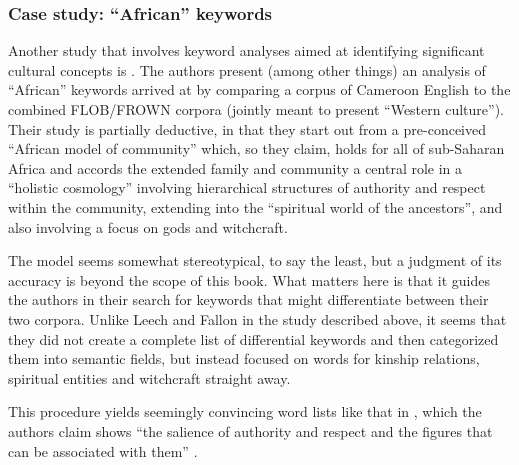 \subsubsection{Case study: ``African'' keywords}
\label{sec:africankeywords}

Another study that involves keyword  analyses aimed at identifying significant cultural  concepts is \citet{wolf_fixed_2007}. The authors present (among other things) an analysis of ``African''  keywords arrived at by comparing a corpus of Cameroon English to the combined FLOB\slash FROWN  corpora (jointly meant to present ``Western culture'').  Their study is partially deductive,  in that they start out from a pre\hyp{}conceived ``African model of community'' which, so they claim, holds for all of sub\hyp{}Saharan Africa and accords the extended family and community a central role in a ``holistic cosmology'' involving hierarchical structures of authority and respect within the community, extending into the ``spiritual world of the ancestors'', and also involving a focus on gods and witchcraft.

The model seems somewhat stereotypical, to say the least, but a judgment of its accuracy is beyond the scope of this book. What matters here is that it guides the authors in their search for keywords  that might differentiate between their two corpora. Unlike Leech and Fallon in the study described above, it seems that they did not create a complete list of differential keywords and then categorized  them into semantic  fields, but instead focused on words for kinship relations, spiritual entities and witchcraft straight away.

This procedure yields seemingly convincing word lists like that in , which the authors claim shows ``the salience of authority and respect and the figures that can be associated  with them'' \citet[420]{wolf_fixed_2007}.

